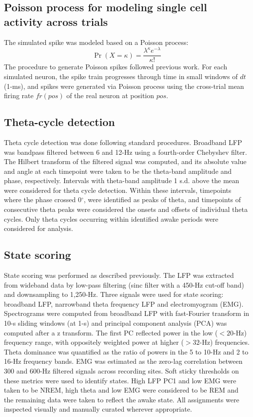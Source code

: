 \subsection{Poisson process for modeling single cell activity across trials}

The simulated spike was modeled based on a Poisson process:
\[
\Pr(X = \kappa) = \frac{\lambda^\kappa e^{-\lambda}}{\kappa!}
\]
The procedure to generate Poisson spikes followed previous work. For each simulated neuron, the spike train progresses through time in small windows of $dt$ (1-ms), and spikes were generated via Poisson process using the cross-trial mean firing rate $fr(pos)$ of the real neuron at position $pos$.

\subsection{Theta-cycle detection}

Theta cycle detection was done following standard procedures. Broadband LFP was bandpass filtered between 6 and 12-Hz using a fourth-order Chebyshev filter. The Hilbert transform of the filtered signal was computed, and its absolute value and angle at each timepoint were taken to be the theta-band amplitude and phase, respectively. Intervals with theta-band amplitude 1 s.d. above the mean were considered for theta cycle detection. Within these intervals, timepoints where the phase crossed 0$^\circ$, were identified as peaks of theta, and timepoints of consecutive theta peaks were considered the onsets and offsets of individual theta cycles. Only theta cycles occurring within identified awake periods were considered for analysis.

\subsection{State scoring}

State scoring was performed as described previously. The LFP was extracted from wideband data by low-pass filtering (sinc filter with a 450-Hz cut-off band) and downsampling to 1,250-Hz. Three signals were used for state scoring: broadband LFP, narrowband theta frequency LFP and electromyogram (EMG). Spectrograms were computed from broadband LFP with fast-Fourier transform in 10-s sliding windows (at 1-s) and principal component analysis (PCA) was computed after a z transform. The first PC reflected power in the low ($< 20$-Hz) frequency range, with oppositely weighted power at higher ($> 32$-Hz) frequencies. Theta dominance was quantified as the ratio of powers in the 5 to 10-Hz and 2 to 16-Hz frequency bands. EMG was estimated as the zero-lag correlation between 300 and 600-Hz filtered signals across recording sites. Soft sticky thresholds on these metrics were used to identify states. High LFP PC1 and low EMG were taken to be NREM, high theta and low EMG were considered to be REM and the remaining data were taken to reflect the awake state. All assignments were inspected visually and manually curated wherever appropriate.

